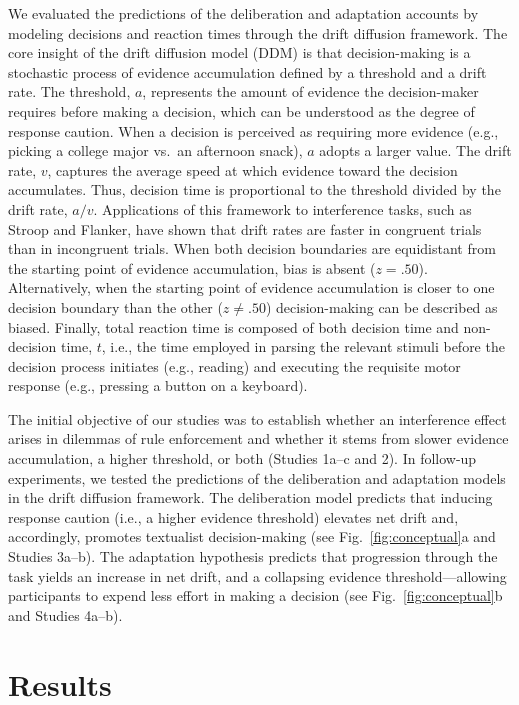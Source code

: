 \documentclass[pdflatex,sn-nature]{sn-jnl}
\begin{document}
We evaluated the predictions of the deliberation and adaptation accounts by modeling decisions and reaction times through the drift diffusion framework\cite{ref14,ref15}. The core insight of the drift diffusion model (DDM) is that decision-making is a stochastic process of evidence accumulation defined by a threshold and a drift rate. The threshold, $a$, represents the amount of evidence the decision-maker requires before making a decision, which can be understood as the degree of response caution. When a decision is perceived as requiring more evidence (e.g., picking a college major vs.\ an afternoon snack), $a$ adopts a larger value. The drift rate, $v$, captures the average speed at which evidence toward the decision accumulates. Thus, decision time is proportional to the threshold divided by the drift rate, $a/v$. Applications of this framework to interference tasks, such as Stroop and Flanker, have shown that drift rates are faster in congruent trials than in incongruent trials. When both decision boundaries are equidistant from the starting point of evidence accumulation, bias is absent ($z = .50$). Alternatively, when the starting point of evidence accumulation is closer to one decision boundary than the other ($z \neq .50$) decision-making can be described as biased. Finally, total reaction time is composed of both decision time and non-decision time, $t$, i.e., the time employed in parsing the relevant stimuli before the decision process initiates (e.g., reading) and executing the requisite motor response (e.g., pressing a button on a keyboard).

The initial objective of our studies was to establish whether an interference effect arises in dilemmas of rule enforcement and whether it stems from slower evidence accumulation, a higher threshold, or both (Studies 1a--c and 2). In follow-up experiments, we tested the predictions of the deliberation and adaptation models in the drift diffusion framework. The deliberation model predicts that inducing response caution (i.e., a higher evidence threshold) elevates net drift and, accordingly, promotes textualist decision-making (see Fig.~\ref{fig:conceptual}a and Studies 3a--b). The adaptation hypothesis predicts that progression through the task yields an increase in net drift, and a collapsing evidence threshold---allowing participants to expend less effort in making a decision (see Fig.~\ref{fig:conceptual}b and Studies 4a--b).

\section{Results}\label{sec:results}
\end{document}
